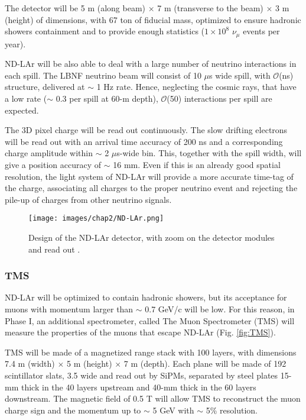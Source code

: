 The detector will be 5 m (along beam) $\times$ 7 m (transverse to the beam) $\times$ 3 m (height) of dimensions, with 67 ton of fiducial mass, optimized to ensure hadronic showers containment and to provide enough statistics ($1 \times 10^8$ $\nu_\mu$ events per year).

ND-LAr will be also able to deal with a large number of neutrino interactions in each spill. The LBNF neutrino beam will consist of 10 $\mu$s wide spill, with $\mathcal{O}$(ns) structure, delivered at $\sim$ 1 Hz rate. Hence, neglecting the cosmic rays, that have a low rate ($\sim$ 0.3 per spill at 60-m depth), $\mathcal{O}$(50) interactions per spill are expected.

The 3D pixel charge will be read out continuously. The slow drifting electrons will be read out with an arrival time accuracy of 200 ns and a corresponding charge amplitude within $\sim$ 2 $\mu$s-wide bin. This, together with the spill width, will give a position accuracy of $\sim$ 16 mm. Even if this is an already good spatial resolution, the light system of ND-LAr will provide a more accurate time-tag of the charge, associating all charges to the proper neutrino event and rejecting the pile-up of charges from other neutrino signals.

\begin{figure}
    \centering
    \texttt{[image: images/chap2/ND-LAr.png]}
    \caption{Design of the ND-LAr detector, with zoom on the detector modules and read out \cite{nd_cdr}.}
    \label{fig:ND-LAr}
\end{figure}

\subsubsection{TMS}
ND-LAr will be optimized to contain hadronic showers, but its acceptance for muons with momentum larger than $\sim$ 0.7 GeV/c will be low. For this reason, in Phase I, an additional spectrometer, called The Muon Spectrometer (TMS) will measure the properties of the muons that escape ND-LAr (Fig. \ref{fig:TMS}).

TMS will be made of a magnetized range stack with 100 layers, with dimensions 7.4 m (width) $\times$ 5 m (height) $\times$ 7 m (depth). Each plane will be made of 192 scintillator slats, 3.5 wide and read out by SiPMs, separated by steel plates 15-mm thick in the 40 layers upstream and 40-mm thick in the 60 layers downstream. 
The magnetic field of 0.5 T will allow TMS to reconstruct the muon charge sign and the momentum up to $\sim$ 5 GeV with $\sim$ 5\% resolution.

